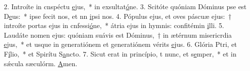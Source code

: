 2. Introíte in cnspéctu \uline{e}jus,~* in exsultat\uline{ó}ne.
3. Scitóte quóniam Dóminus pse est D\uline{e}us:~* ipse fecit nos, et nn \uline{i}psi nos.
4. Pópulus ejus, et oves páscuæ ejus:~† introíte portas ejus in cnfessi\uline{ó}ne,~* átria ejus in hymnis: confitémin \uline{i}lli.
5. Laudáte nomen ejus: quóniam suávis est Dóminus,~† in ætérnum misericrdia \uline{e}jus,~* et usque in generatiónem et generatiónem vérits \uline{e}jus.
6. Glória Ptri, et F\uline{í}lio,~* et Spirítu S\uline{a}ncto.
7. Sicut erat in princípio, t nunc, et s\uline{e}mper,~* et in sǽcula sæculórm. \uline{A}men.
